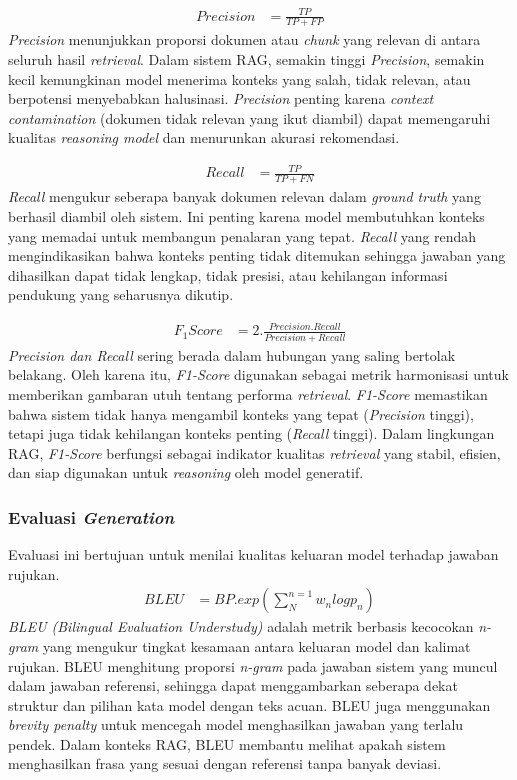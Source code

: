 \begin{align}
Precision &= \frac{TP}{TP+FP}
\end{align}
\textit{Precision} menunjukkan proporsi dokumen atau \textit{chunk} yang relevan di antara seluruh hasil \textit{retrieval}. Dalam sistem RAG, semakin tinggi \textit{Precision}, semakin kecil kemungkinan model menerima konteks yang salah, tidak relevan, atau berpotensi menyebabkan halusinasi. \textit{Precision} penting karena \textit{context contamination} (dokumen tidak relevan yang ikut diambil) dapat memengaruhi kualitas \textit{reasoning model} dan menurunkan akurasi rekomendasi.

\begin{align}
Recall &= \frac{TP}{TP+FN} 
\end{align}
\textit{Recall} mengukur seberapa banyak dokumen relevan dalam \textit{ground truth} yang berhasil diambil oleh sistem. Ini penting karena model membutuhkan konteks yang memadai untuk membangun penalaran yang tepat. \textit{Recall} yang rendah mengindikasikan bahwa konteks penting tidak ditemukan sehingga jawaban yang dihasilkan dapat tidak lengkap, tidak presisi, atau kehilangan informasi pendukung yang seharusnya dikutip.

\begin{align}
F_{1}Score &= 2.\frac{Precision.Recall}{Precision+Recall}
\end{align}
\textit{Precision dan Recall} sering berada dalam hubungan yang saling bertolak belakang. Oleh karena itu, \textit{F1-Score} digunakan sebagai metrik harmonisasi untuk memberikan gambaran utuh tentang performa \textit{retrieval}. \textit{F1-Score} memastikan bahwa sistem tidak hanya mengambil konteks yang tepat (\textit{Precision} tinggi), tetapi juga tidak kehilangan konteks penting (\textit{Recall} tinggi). Dalam lingkungan RAG, \textit{F1-Score} berfungsi sebagai indikator kualitas \textit{retrieval} yang stabil, efisien, dan siap digunakan untuk \textit{reasoning} oleh model generatif.

\subsubsection{Evaluasi \textit{Generation}}
Evaluasi ini bertujuan untuk menilai kualitas keluaran model terhadap jawaban rujukan.
\begin{align}
BLEU &= BP.exp(\sum_{N}^{n=1} w_n log   p_n) 
\end{align}
\textit{BLEU (Bilingual Evaluation Understudy)} adalah metrik berbasis kecocokan \textit{n-gram} yang mengukur tingkat kesamaan antara keluaran model dan kalimat rujukan. BLEU menghitung proporsi \textit{n-gram} pada jawaban sistem yang muncul dalam jawaban referensi, sehingga dapat menggambarkan seberapa dekat struktur dan pilihan kata model dengan teks acuan. BLEU juga menggunakan \textit{brevity penalty} untuk mencegah model menghasilkan jawaban yang terlalu pendek. Dalam konteks RAG, BLEU membantu melihat apakah sistem menghasilkan frasa yang sesuai dengan referensi tanpa banyak deviasi.

